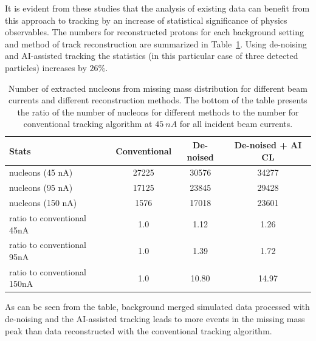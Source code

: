 It is evident from these studies that the analysis of existing data can benefit from this approach to tracking by an increase 
of statistical significance of physics observables. The numbers for reconstructed protons for each background setting 
and method of track reconstruction are summarized in Table~\ref{table:summary}. Using de-noising and AI-assisted 
tracking the statistics (in this particular case of three detected particles) increases by $26\%$. 

\begin{table}
\begin{center}
\begin{tabular}{l|ccc}
Stats & Conventional & De-noised & De-noised + AI CL \\
\hline
 nucleons (45 nA)  & 27225 &  30576 & 34277 \\
 nucleons (95 nA)  & 17125 & 23845 & 29428 \\
 nucleons (150 nA) &  1576 & 17018 & 23601 \\
\hline
\hline
ratio to conventional 45nA & 1.0 & 1.12 & 1.26 \\
ratio to conventional 95nA & 1.0 & 1.39 & 1.72 \\
ratio to conventional 150nA & 1.0 & 10.80 & 14.97 \\
\end{tabular}
\end{center}
\caption{Number of extracted nucleons from missing mass distribution for different beam currents
and different reconstruction methods. The bottom of the table presents the ratio of the number of nucleons for
different methods to the number for conventional tracking algorithm at $45~nA$ for all incident beam currents.}
 \label{table:summary}
\end{table}

As can be seen from the table, background merged simulated data processed with de-noising and the
 AI-assisted tracking leads to more events in the missing mass peak than data reconstructed with the 
 conventional tracking algorithm.
 
